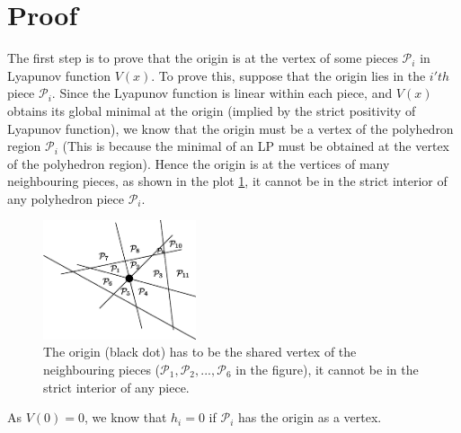 \documentclass{article}
\begin{document}
\section{Proof}
The first step is to prove that the origin is at the vertex of some pieces $\mathcal{P}_i$ in Lyapunov function $V(x)$. To prove this, suppose that the origin lies in the $i'th$ piece $\mathcal{P}_i$. Since the Lyapunov function is linear within each piece, and $V(x)$ obtains its global minimal at the origin (implied by the strict positivity of Lyapunov function), we know that the origin must be a vertex of the polyhedron region $\mathcal{P}_i$ (This is because the minimal of an LP must be obtained at the vertex of the polyhedron region). Hence the origin is at the vertices of many neighbouring pieces, as shown in the plot \ref{fig:global_convergence1}, it cannot be in the strict interior of any polyhedron piece $\mathcal{P}_i$.
\begin{figure}
	\centering
	\includegraphics[width=0.4\textwidth]{./global_convergence1.eps}
	\caption{The origin (black dot) has to be the shared vertex of the neighbouring pieces ($\mathcal{P}_1, \mathcal{P}_2, ..., \mathcal{P}_6$ in the figure), it cannot be in the strict interior of any piece.}
	\label{fig:global_convergence1}
\end{figure}
As $V(0)=0$, we know that $h_i = 0$ if $\mathcal{P}_i$ has the origin as a vertex.
\end{document}
